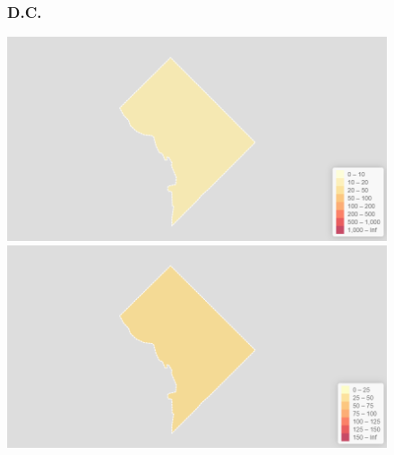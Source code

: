 \documentclass[11pt]{article}
\begin{document}
\begin{landscape}
\thispagestyle{empty}
\begin{figure}[h]
\subsubsection*{D.C.}
\hspace*{-3cm}
\begin{minipage}{.8\textwidth}
    \includegraphics[width=.95\textwidth]{ImageResults/DCTotal.PNG}
\end{minipage}%
\begin{minipage}{.8\textwidth}
    \includegraphics[width=.95\textwidth]{ImageResults/DC100k.PNG}
\end{minipage}

\end{figure}
\end{landscape}
\end{document}
